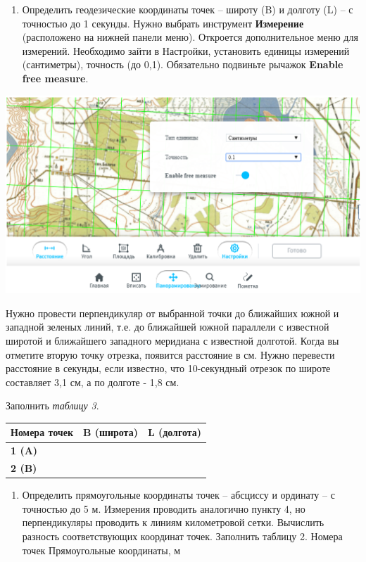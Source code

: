 \documentclass[
  12pt,
]{book}
\providecommand{\tightlist}{%
  \setlength{\itemsep}{0pt}\setlength{\parskip}{0pt}}
\begin{document}
\begin{enumerate}
\def\labelenumi{\arabic{enumi}.}
\setcounter{enumi}{3}
\tightlist
\item
  Определить геодезические координаты точек -- широту (B) и долготу (L) -- с точностью до 1 секунды. Нужно выбрать инструмент \textbf{Измерение} (расположено на нижней панели меню). Откроется дополнительное меню для измерений. Необходимо зайти в Настройки, установить единицы измерений (сантиметры), точность (до 0,1). Обязательно подвиньте рычажок \textbf{Enable free measure}.
\end{enumerate}

\includegraphics{images/Coordinates/Measure.png}

Нужно провести перпендикуляр от выбранной точки до ближайших южной и западной зеленых линий, т.е. до ближайшей южной параллели с известной широтой и ближайшего западного меридиана с известной долготой. Когда вы отметите вторую точку отрезка, появится расстояние в см. Нужно перевести расстояние в секунды, если известно, что 10-секундный отрезок по широте составляет 3,1 см, а по долготе - 1,8 см.

Заполнить \emph{таблицу 3}.

\begin{longtable}[]{@{}lll@{}}
\toprule\noalign{}
Номера точек & B (широта) & L (долгота) \\
\midrule\noalign{}
\endhead
\bottomrule\noalign{}
\endlastfoot
\textbf{1 (A)} & & \\
\textbf{2 (B)} & & \\
\end{longtable}

\begin{enumerate}
\def\labelenumi{\arabic{enumi}.}
\setcounter{enumi}{4}
\tightlist
\item
  Определить прямоугольные координаты точек -- абсциссу и ординату -- с точностью до 5 м.
  Измерения проводить аналогично пункту 4, но перпендикуляры проводить к линиям километровой сетки. Вычислить разность соответствующих координат точек. Заполнить таблицу 2.
  Номера точек Прямоугольные координаты, м
\end{enumerate}
\end{document}
